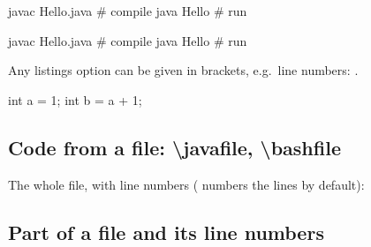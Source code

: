 \documentclass[11pt]{amsart}         %
\begin{document}
\begin{texcode}
\begin{bashcode}
javac Hello.java   # compile
java Hello         # run
\end{bashcode}
\end{texcode}

\begin{bashcode}
javac Hello.java   # compile
java Hello         # run
\end{bashcode}

Any listings option can be given in brackets, e.g.\ line numbers:
.

\begin{javacode}[numbers=left]
int a = 1;
int b = a + 1;
\end{javacode}


\subsection{Code from a file: \textbackslash javafile, \textbackslash bashfile}

The whole file, with line numbers ( numbers the lines by default):

\begin{texcode}
\end{texcode}


\begin{texcode}
\end{texcode}



\subsection{Part of a file and its line numbers}\label{sec:firstnumber}
\end{document}
